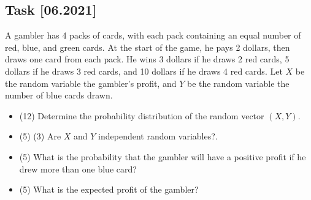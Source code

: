 \documentclass[a4paper, 12pt]{article}
\begin{document}
\subsection*{Task [06.2021]}

A gambler has 4 packs of cards, with each pack containing an equal number of red, blue, and green cards. At the start of the game, he pays 2 dollars, then draws one card from each pack. He wins 3 dollars if he draws 2 red cards, 5 dollars if he draws 3 red cards, and 10 dollars if he draws 4 red cards. Let $X$ be the random variable  the gambler's profit, and $Y$ be the random variable the number of blue cards drawn.

\begin{itemize}
\item  [a)]  (12) Determine the probability distribution of the random vector $(X, Y)$.
\item  [b)] (5) (3) Are $X$ and $Y$ independent random variables?.
\item  [c)] (5) What is the probability that the gambler will have a positive profit if he drew more than one blue card?
\item  [d)] (5) What is the expected profit of the gambler?
\end{itemize}
\end{document}

